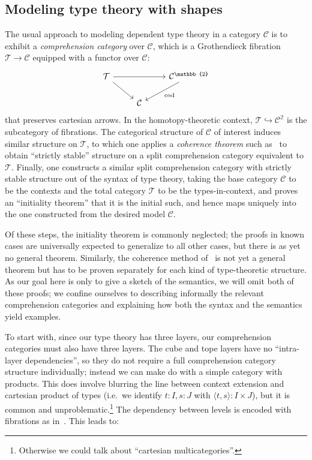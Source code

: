 \documentclass{amsart}
\theoremstyle{plain}
\theoremstyle{definition}
\theoremstyle{remark}
\numberwithin{equation}{section}
\newcommand{\pair}[1]{\langle #1\rangle}
\newcommand{\two}{\mathbb{2}}
\newcommand{\C}{\mathcal{C}}
\newcommand{\T}{\mathcal{T}}
\begin{document}
\subsection{Modeling type theory with shapes}
\label{sec:models-type-theory}

The usual approach to modeling dependent type theory in a category $\C$ is to exhibit a \emph{comprehension category} over $\C$, which is a Grothendieck fibration $\T\to\C$ equipped with a functor over $\C$:
\[
\begin{tikzcd}
  \T \ar[rr] \ar[dr] && \C^\two \ar[dl,"\mathrm{cod}"] \\ &\C
\end{tikzcd}
\]
that preserves cartesian arrows.
In the homotopy-theoretic context, $\T \hookrightarrow \C^\two$ is the subcategory of fibrations.
The categorical structure of $\C$ of interest induces similar structure on $\T$, to which one applies a \emph{coherence theorem} such as~\cite{LW} to obtain ``strictly stable'' structure on a split comprehension category equivalent to $\T$.
Finally, one constructs a similar split comprehension category with strictly stable structure out of the syntax of type theory, taking the base category $\C$ to be the contexts and the total category $\T$ to be the types-in-context, and proves an ``initiality theorem'' that it is the initial such, and hence maps uniquely into the one constructed from the desired model $\C$.

Of these steps, the initiality theorem is commonly neglected; the proofs in known cases are universally expected to generalize to all other cases, but there is as yet no general theorem.
Similarly, the coherence method of~\cite{LW} is not yet a general theorem but has to be proven separately for each kind of type-theoretic structure.
As our goal here is only to give a sketch of the semantics, we will omit both of these proofs; we confine ourselves to describing informally the relevant comprehension categories and explaining how both the syntax and the semantics yield examples.

To start with, since our type theory has three layers, our comprehension categories must also have three layers.
The cube and tope layers have no ``intra-layer dependencies'', so they do not require a full comprehension category structure individually; instead we can make do with a simple category with products.
This does involve blurring the line between context extension and cartesian product of types (i.e.\ we identify $t:I,s:J$ with $\pair{t,s}:I\times J$), but it is common and unproblematic.\footnote{Otherwise we could talk about ``cartesian multicategories''.}
The dependency between levels is encoded with fibrations as in~\cite{J}.
This leads to:
\end{document}
